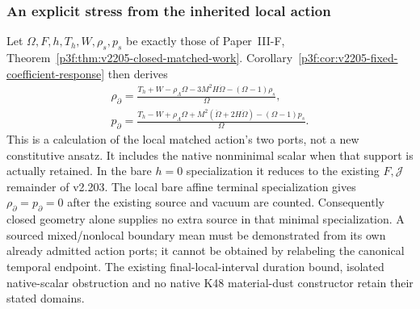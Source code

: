 \documentclass[12pt,a4paper]{article}
\begin{document}
\subsubsection{An explicit stress from the inherited local action}
Let $\Omega,F,h,T_h,W,\rho_s,p_s$ be exactly those of
Paper~III-F, Theorem~\ref{p3f:thm:v2205-closed-matched-work}.
Corollary~\ref{p3f:cor:v2205-fixed-coefficient-response} then derives
\begin{align}
\label{p8:eq:v2205-native-homogeneous-stress}
 \boxed{\rho_\partial
 =\frac{T_h+W-\rho_\Lambda\Omega-3M^2H\dot\Omega
                    -(\Omega-1)\rho_s}{\Omega},}\\
 \boxed{p_\partial
 =\frac{T_h-W+\rho_\Lambda\Omega
       +M^2(\ddot\Omega+2H\dot\Omega)
                    -(\Omega-1)p_s}{\Omega}.}\nonumber
\end{align}
This is a calculation of the local matched action's two ports, not a
new constitutive ansatz. It includes the native nonminimal scalar when
that support is actually retained. In the bare $h=0$ specialization it
reduces to the existing $F,\mathcal J$ remainder of v2.203.
The local bare affine terminal specialization gives
$\rho_\partial=p_\partial=0$ after the existing source and vacuum are
counted. Consequently closed geometry alone supplies no extra
source in that minimal specialization. A sourced mixed/nonlocal boundary
mean must be demonstrated from its own already admitted action ports;
it cannot be obtained by relabeling the canonical temporal endpoint.
The existing final-local-interval duration bound, isolated native-scalar
obstruction and no native K48 material-dust constructor retain their
stated domains.

\end{document}
